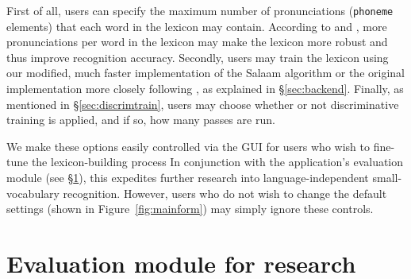 \documentclass[11pt]{article}
\begin{document}
First of all, users
can specify the maximum number of pronunciations (\texttt{phoneme} elements) that each word in the lexicon may contain. According to  and , more pronunciations per word in the lexicon may make the lexicon more robust and thus improve recognition accuracy.
Secondly, users may train the lexicon using our modified, much faster implementation of the Salaam algorithm or the original implementation more closely following , as explained in \S\ref{sec:backend}.
Finally, as mentioned in \S\ref{sec:discrimtrain}, users may choose whether or not discriminative training 
is applied, and if so, how many passes are run.

We make these options easily controlled via the GUI for users who wish to fine-tune the lexicon-building process
In conjunction with the application's evaluation module (see \S\ref{sec:evaluation}), this expedites further research into language-independent small-vocabulary recognition. However, users who do not wish to change the default settings (shown in Figure~\ref{fig:mainform}) may simply ignore these controls.



\section{Evaluation module for research}
\label{sec:evaluation}
\end{document}
